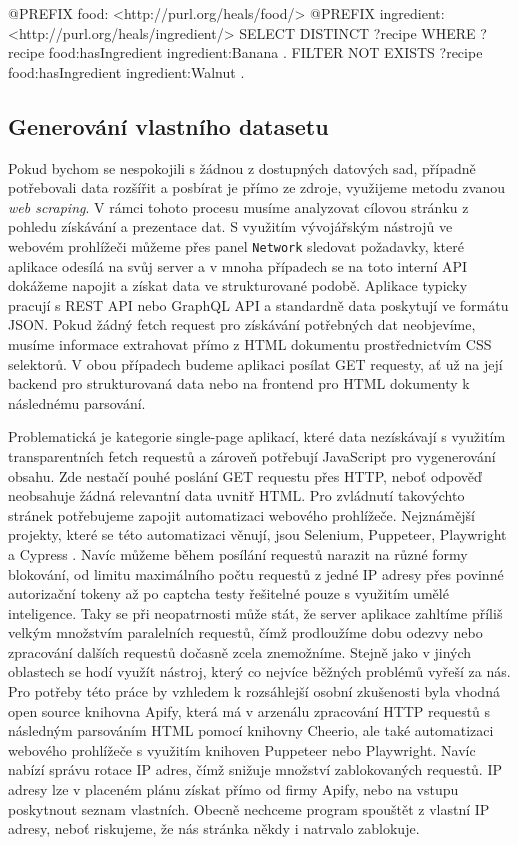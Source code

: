 \begin{code}
@PREFIX food: <http://purl.org/heals/food/>
@PREFIX ingredient: <http://purl.org/heals/ingredient/>
SELECT DISTINCT ?recipe
WHERE {
    ?recipe food:hasIngredient ingredient:Banana .
    FILTER NOT EXISTS {
        ?recipe food:hasIngredient ingredient:Walnut .
    }
}
\end{code}

\subsection{Generování vlastního datasetu}

Pokud bychom se nespokojili s žádnou z dostupných datových sad, případně potřebovali data rozšířit a posbírat je přímo ze zdroje, využijeme metodu zvanou \emph{web scraping}. V rámci tohoto procesu musíme analyzovat cílovou stránku z pohledu získávání a prezentace dat. S využitím vývojářským nástrojů ve webovém prohlížeči můžeme přes panel \texttt{Network} sledovat požadavky, které aplikace odesílá na svůj server a v mnoha případech se na toto interní API dokážeme napojit a získat data ve strukturované podobě. Aplikace typicky pracují s REST API nebo GraphQL API a standardně data poskytují ve formátu JSON. Pokud žádný fetch request pro získávání potřebných dat neobjevíme, musíme informace extrahovat přímo z HTML dokumentu prostřednictvím CSS selektorů. V obou případech budeme aplikaci posílat GET requesty, ať už na její backend pro strukturovaná data nebo na frontend pro HTML dokumenty k následnému parsování.

Problematická je kategorie single-page aplikací, které data nezískávají s využitím transparentních fetch requestů a zároveň potřebují JavaScript pro vygenerování obsahu. Zde nestačí pouhé poslání GET requestu přes HTTP, neboť odpověď neobsahuje žádná relevantní data uvnitř HTML. Pro zvládnutí takovýchto stránek potřebujeme zapojit automatizaci webového prohlížeče. Nejznámější projekty, které se této automatizaci věnují, jsou Selenium, Puppeteer, Playwright a Cypress \citep{selenium-ecosystem}. Navíc můžeme během posílání requestů narazit na různé formy blokování, od limitu maximálního počtu requestů z jedné IP adresy přes povinné autorizační tokeny až po captcha testy řešitelné pouze s využitím umělé inteligence. Taky se při neopatrnosti může stát, že server aplikace zahltíme příliš velkým množstvím paralelních requestů, čímž prodloužíme dobu odezvy nebo zpracování dalších requestů dočasně zcela znemožníme. Stejně jako v jiných oblastech se hodí využít nástroj, který co nejvíce běžných problémů vyřeší za nás. Pro potřeby této práce by vzhledem k rozsáhlejší osobní zkušenosti byla vhodná open source knihovna Apify, která má v arzenálu zpracování HTTP requestů s následným parsováním HTML pomocí knihovny Cheerio, ale také automatizaci webového prohlížeče s využitím knihoven Puppeteer nebo Playwright. Navíc nabízí správu rotace IP adres, čímž snižuje množství zablokovaných requestů. IP adresy lze v placeném plánu získat přímo od firmy Apify, nebo na vstupu poskytnout seznam vlastních. Obecně nechceme program spouštět z vlastní IP adresy, neboť riskujeme, že nás stránka někdy i natrvalo zablokuje.
  